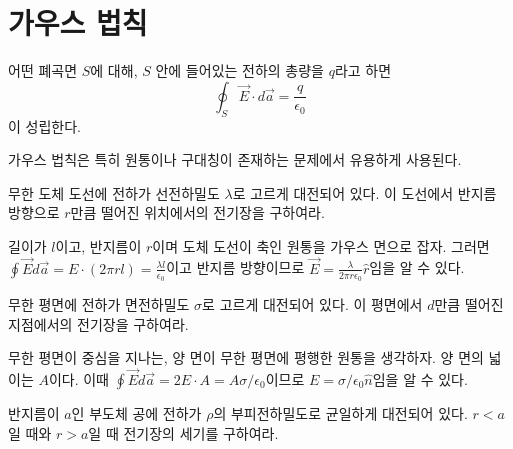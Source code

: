 \section{가우스 법칙}
\begin{theorem}[가우스 법칙]
어떤 폐곡면 $S$에 대해, $S$ 안에 들어있는 전하의 총량을 $q$라고 하면 
\begin{equation}
\oint_S \vec{E}\cdot d\vec{a}=\frac{q}{\epsilon_0}
\end{equation}
이 성립한다. 
\end{theorem}
가우스 법칙은 특히 원통이나 구대칭이 존재하는 문제에서 유용하게 사용된다.

\begin{example}[원통 대칭]
무한 도체 도선에 전하가 선전하밀도 $\lambda$로 고르게 대전되어 있다. 이 도선에서 반지름 방향으로 $r$만큼 떨어진 위치에서의 전기장을 구하여라.
\end{example}
길이가 $l$이고, 반지름이 $r$이며 도체 도선이 축인 원통을 가우스 면으로 잡자. 그러면 $\oint \vec{E}d\vec{a}=E\cdot(2\pi r l)=\frac{\lambda l}{\epsilon_0}$이고 반지름 방향이므로 $\vec{E}=\frac{\lambda}{2\pi r\epsilon_0}\hat{r}$임을 알 수 있다.\\

\begin{example}[평면 대칭]
무한 평면에 전하가 면전하밀도 $\sigma$로 고르게 대전되어 있다. 이 평면에서 $d$만큼 떨어진 지점에서의 전기장을 구하여라.
\end{example}
무한 평면이 중심을 지나는, 양 면이 무한 평면에 평행한 원통을 생각하자. 양 면의 넓이는 $A$이다.  이때 $\oint \vec{E}d\vec{a}=2E\cdot A=A\sigma /\epsilon_0$이므로 $E=\sigma/\epsilon_0 \hat{n}$임을 알 수 있다.


\begin{exercise}[구면 대칭]
반지름이 $a$인 부도체 공에 전하가 $\rho$의 부피전하밀도로 균일하게 대전되어 있다. $r<a$일 때와 $r>a$일 때 전기장의 세기를 구하여라.
\end{exercise}

